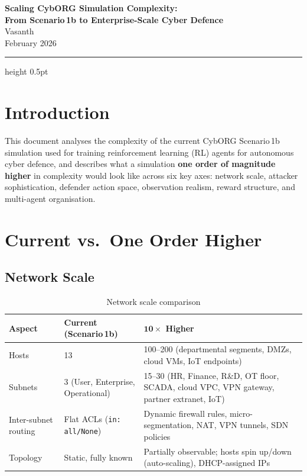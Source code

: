 \documentclass[11pt,a4paper]{article}
\begin{document}
\begin{center}
    {\LARGE\bfseries\color{headerblue} Scaling CybORG Simulation Complexity:\\[4pt]
    From Scenario\,1b to Enterprise-Scale Cyber Defence}\\[12pt]
    {\large Vasanth}\\[4pt]
    {\normalsize February 2026}
\end{center}

\vspace{1em}
\hrule height 0.5pt
\vspace{1.5em}

\section{Introduction}

This document analyses the complexity of the current CybORG Scenario\,1b simulation
used for training reinforcement learning (RL) agents for autonomous cyber defence,
and describes what a simulation \textbf{one order of magnitude higher} in complexity
would look like across six key axes: network scale, attacker sophistication,
defender action space, observation realism, reward structure, and multi-agent
organisation.

\section{Current vs.\ One Order Higher}

\subsection{Network Scale}

\begin{table}[h!]
\centering
\caption{Network scale comparison}
\label{tab:network}
\begin{tabularx}{\textwidth}{@{} l X X @{}}
\toprule
\textbf{Aspect} & \textbf{Current (Scenario\,1b)} & \textbf{$\mathbf{10\times}$ Higher} \\
\midrule
Hosts & 13 & 100--200 (departmental segments, DMZs, cloud VMs, IoT endpoints) \\
Subnets & 3 (User, Enterprise, Operational) & 15--30 (HR, Finance, R\&D, OT floor, SCADA, cloud VPC, VPN gateway, partner extranet, IoT) \\
Inter-subnet routing & Flat ACLs (\texttt{in: all/None}) & Dynamic firewall rules, micro-segmentation, NAT, VPN tunnels, SDN policies \\
Topology & Static, fully known & Partially observable; hosts spin up/down (auto-scaling), DHCP-assigned IPs \\
\bottomrule
\end{tabularx}
\end{table}
\end{document}
